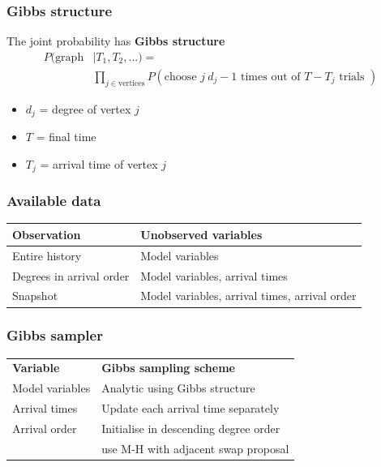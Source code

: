 \documentclass[final,hyperref={pdfpagelabels=false},noamsthm]{beamer}
\begin{document}
\begin{frame}
	\frametitle{Gibbs structure}
	The joint probability has \textbf{Gibbs structure}
	\begin{align*}
	P(\text{graph}&|T_1, T_2, ...) = \\
	& \prod_{j \in \text{vertices}} P(\text{choose }j\ d_j-1\text{ times out of } T - T_j \text{ trials })
	\end{align*}
	\begin{itemize}
		\item $d_j$ = degree of vertex $j$
		\item $T$ = final time
		\item $T_j$ = arrival time of vertex $j$
	\end{itemize}
\end{frame}

\begin{frame}
	\frametitle{Available data}
	\begin{center}
		\begin{tabular}{ll}
			\textbf{Observation} & \textbf{Unobserved variables} \\
			\hline
			Entire history & Model variables \\
			Degrees in arrival order & Model variables, arrival times \\
			Snapshot & Model variables, arrival times, arrival order
		\end{tabular}
	\end{center}
\end{frame}

\begin{frame}
	\frametitle{Gibbs sampler}
	\begin{center}
		\begin{tabular}{l|l}
			\textbf{Variable} & \textbf{Gibbs sampling scheme} \\
			\Xhline{4\arrayrulewidth}
			\rule{0pt}{3ex}
			Model variables & Analytic using Gibbs structure \\
			\hline
			\rule{0pt}{3ex}
			Arrival times & Update each arrival time separately \\
			\hline
			\rule{0pt}{3ex}
			Arrival order & Initialise in descending degree order \\
			& \quad use M-H with adjacent swap proposal 
		\end{tabular}
	\end{center}
\end{frame}
\end{document}
